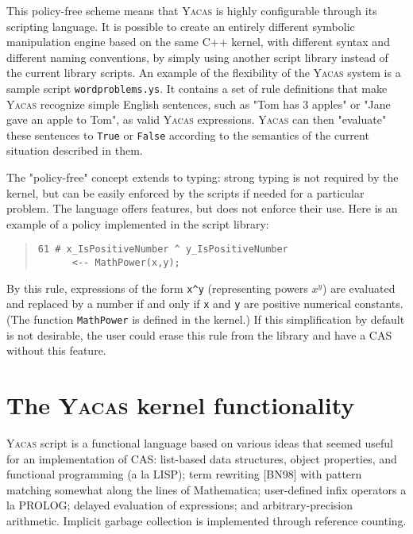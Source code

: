 \documentclass{llncs}
\begin{document}
This policy-free scheme means that \textsc{Yacas} is highly configurable through its
scripting language. It is possible to create an entirely different symbolic
manipulation engine based on the same C++ kernel, with different syntax and
different naming  conventions, by simply using another script library instead
of the current library scripts. An example of the flexibility of the \textsc{Yacas}
system is a sample script \texttt{wordproblems.ys}. It contains a set of rule
definitions that make \textsc{Yacas} recognize simple English sentences, such as "Tom
has 3 apples" or "Jane gave an apple to Tom", as valid \textsc{Yacas} expressions. \textsc{Yacas}
can then "evaluate" these sentences to \texttt{True} or \texttt{False} according to
the semantics of the current situation described in them.


The "policy-free" concept extends to typing: strong typing is not required by
the kernel, but can be easily enforced by the  scripts if needed for a
particular problem. The language offers features, but does not enforce their
use.
Here is an example of a policy implemented in the script library:


\begin{quote}\small\begin{verbatim}
61 # x_IsPositiveNumber ^ y_IsPositiveNumber 
      <-- MathPower(x,y);
\end{verbatim}\end{quote}
By this rule, expressions of the form \verb|x^y| (representing powers $x ^{y}$) are
evaluated and replaced by a number if and only if \texttt{x} and \texttt{y} are positive
numerical constants. (The function \texttt{MathPower} is  defined in the kernel.) If
this simplification by default is not desirable, the user could erase this rule
from the library
and have a CAS without this feature.


\section{The \textsc{Yacas} kernel functionality}
\textsc{Yacas} script is a functional language based on various ideas that seemed useful
for an implementation of CAS: list-based data structures, object properties,
and functional programming (a la LISP); term rewriting [BN98] with
pattern matching somewhat along the lines of Mathematica; user-defined infix
operators a la PROLOG; delayed evaluation of expressions; and
arbitrary-precision arithmetic.
Implicit garbage collection is implemented through reference counting.
\end{document}
